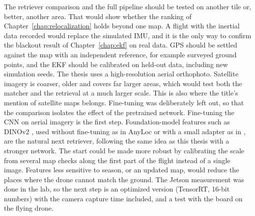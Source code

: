 \documentclass[english, Lau, oneside]{sapthesis}%
\begin{document}
The retriever comparison and the full pipeline should be tested on another tile or, better, another area. That would show whether the ranking of Chapter~\ref{chap:relocalization} holds beyond one map.
A flight with the inertial data recorded would replace the simulated IMU, and it is the only way to confirm the blackout result of Chapter~\ref{chap:ekf} on real data.
GPS should be settled against the map with an independent reference, for example surveyed ground points, and the EKF should be calibrated on held-out data, including new simulation seeds.
The thesis uses a high-resolution aerial orthophoto. Satellite imagery is coarser, older and covers far larger areas, which would test both the matcher and the retrieval at a much larger scale. This is also where the title's mention of satellite maps belongs.
Fine-tuning was deliberately left out, so that the comparison isolates the effect of the pretrained network. Fine-tuning the CNN on aerial imagery is the first step. Foundation-model features such as DINOv2 \citep{oquab2023dinov2}, used without fine-tuning as in AnyLoc \citep{keetha2023anyloc} or with a small adapter as in \citet{li2024crossview}, are the natural next retriever, following the same idea as this thesis with a stronger network.
The start could be made more robust by calibrating the scale from several map checks along the first part of the flight instead of a single image. Features less sensitive to season, or an updated map, would reduce the places where the drone cannot match the ground.
The Jetson measurement was done in the lab, so the next step is an optimized version (TensorRT, 16-bit numbers) with the camera capture time included, and a test with the board on the flying drone.
\end{document}
